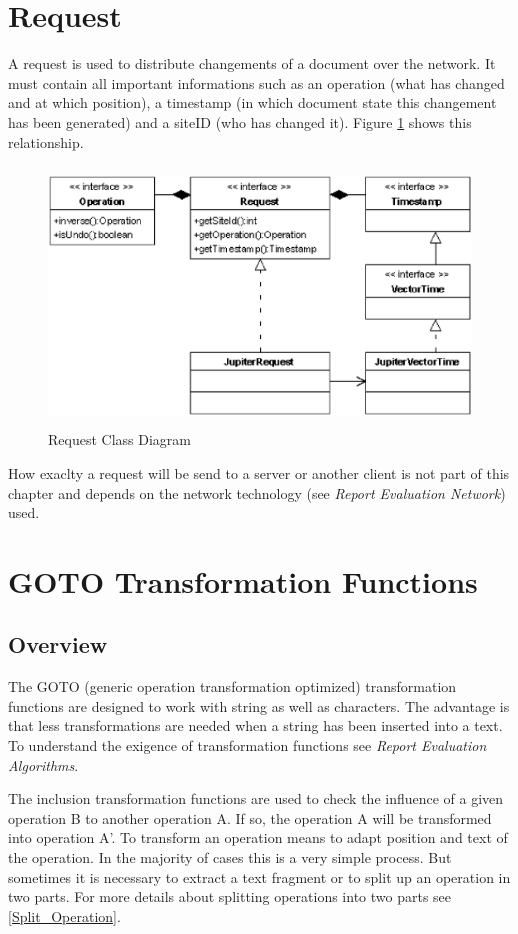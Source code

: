 \section{Request}
A request is used to distribute changements of a document over the network. It must contain all important informations such as an operation (what has changed and at which position), a timestamp (in which document state this changement has been generated) and a siteID (who has changed it). Figure \ref{Request Class Diagram} shows this relationship.

\begin{figure}[H]
\centering
\includegraphics[height=6.87cm,width=12.09cm]{../../images/algo-impl/request_classdiagram.eps}
\caption{Request Class Diagram}
\label{Request Class Diagram}
\end{figure}

How exaclty a request will be send to a server or another client is not part of this chapter and depends on the network technology (see \emph{Report Evaluation Network}) used.


\section{GOTO Transformation Functions}

\subsection{Overview}
The GOTO (generic operation transformation optimized) transformation functions are designed to work with string as well as characters. The advantage is that less transformations are needed when a string has been inserted into a text. To understand the exigence of transformation functions see \emph{Report Evaluation Algorithms}.

The inclusion transformation functions are used to check the influence of a given operation B to another operation A. If so, the operation A will be transformed into operation A'. To transform an operation means to adapt position and text of the operation. In the majority of cases this is a very simple process. But sometimes it is necessary to extract a text fragment or to split up an operation in two parts. For more details about splitting operations into two parts see \ref{Split_Operation}.

